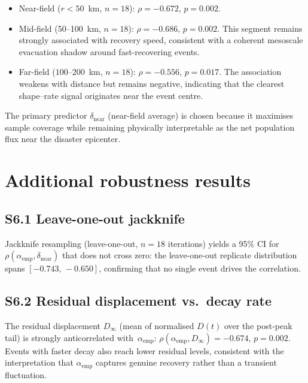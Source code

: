 \documentclass[11pt]{article}
\newcommand{\dnear}{\delta_{\mathrm{near}}}
\newcommand{\aemp}{\alpha_{\mathrm{emp}}}
\begin{document}
\begin{itemize}
  \item Near-field ($r < 50$~km, $n = 18$):
        $\rho = -0.672$, $p = 0.002$.
  \item Mid-field (50--100~km, $n = 18$):
        $\rho = -0.686$, $p = 0.002$.  This segment remains strongly
        associated with recovery speed, consistent with a coherent
        mesoscale evacuation shadow around fast-recovering events.
  \item Far-field ($100$--$200$~km, $n = 18$):
        $\rho = -0.556$, $p = 0.017$.  The association weakens with
        distance but remains negative, indicating that the clearest
        shape--rate signal originates near the event centre.
\end{itemize}

The primary predictor $\dnear$ (near-field average) is chosen because
it maximises sample coverage while remaining physically interpretable
as the net population flux near the disaster epicenter.


\section{Additional robustness results}
\label{sec:si_additional}

\subsection*{S6.1 Leave-one-out jackknife}

Jackknife resampling (leave-one-out, $n=18$ iterations) yields a
95\% CI for $\rho(\aemp,\dnear)$ that does not cross zero: the
leave-one-out replicate distribution spans $[-0.743,\,-0.650]$,
confirming that no single event drives the correlation.

\subsection*{S6.2 Residual displacement vs.\ decay rate}

The residual displacement $D_\infty$ (mean of normalised $D(t)$
over the post-peak tail) is strongly anticorrelated with~$\aemp$:
$\rho(\aemp, D_\infty) = -0.674$, $p = 0.002$.  Events with
faster decay also reach lower residual levels, consistent with the
interpretation that $\aemp$ captures genuine recovery rather than a
transient fluctuation.
\end{document}
